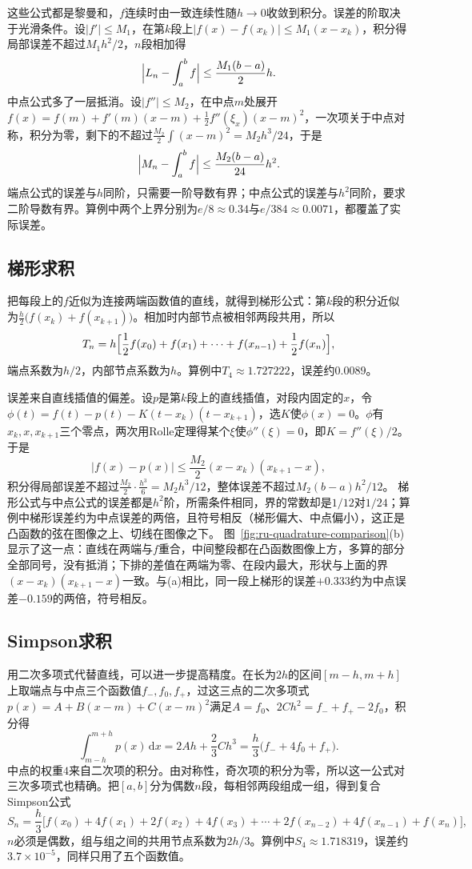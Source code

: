 这些公式都是黎曼和，$f$连续时由一致连续性随$h\to0$收敛到积分。误差的阶取决于光滑条件。设$|f'|\leq M_1$，在第$k$段上$|f(x)-f(x_k)|\leq M_1(x-x_k)$，积分得局部误差不超过$M_1h^2/2$，$n$段相加得
\[
 \Bigl|L_n-\int_a^bf\Bigr|\leq\frac{M_1(b-a)}2h.
\]
中点公式多了一层抵消。设$|f''|\leq M_2$，在中点$m$处展开$f(x)=f(m)+f'(m)(x-m)+\frac12f''(\xi_x)(x-m)^2$，一次项关于中点对称，积分为零，剩下的不超过$\frac{M_2}2\int(x-m)^2=M_2h^3/24$，于是
\[
 \Bigl|M_n-\int_a^bf\Bigr|\leq\frac{M_2(b-a)}{24}h^2.
\]
端点公式的误差与$h$同阶，只需要一阶导数有界；中点公式的误差与$h^2$同阶，要求二阶导数有界。算例中两个上界分别为$e/8\approx0.34$与$e/384\approx0.0071$，都覆盖了实际误差。

\subsection{梯形求积}
\label{sec:ru-trapezoid-rule}

把每段上的$f$近似为连接两端函数值的直线，就得到梯形公式：第$k$段的积分近似为$\frac h2\bigl(f(x_k)+f(x_{k+1})\bigr)$。相加时内部节点被相邻两段共用，所以
\[
 T_n=h\Bigl[\frac12f(x_0)+f(x_1)+\cdots+f(x_{n-1})+\frac12f(x_n)\Bigr],
\]
端点系数为$h/2$，内部节点系数为$h$。算例中$T_4\approx1.727222$，误差约$0.0089$。

误差来自直线插值的偏差。设$p$是第$k$段上的直线插值，对段内固定的$x$，令$\phi(t)=f(t)-p(t)-K(t-x_k)(t-x_{k+1})$，选$K$使$\phi(x)=0$。$\phi$有$x_k,x,x_{k+1}$三个零点，两次用Rolle定理得某个$\xi$使$\phi''(\xi)=0$，即$K=f''(\xi)/2$。于是
\[
 |f(x)-p(x)|\leq\frac{M_2}2(x-x_k)(x_{k+1}-x),
\]
积分得局部误差不超过$\frac{M_2}2\cdot\frac{h^3}6=M_2h^3/12$，整体误差不超过$M_2(b-a)h^2/12$。
梯形公式与中点公式的误差都是$h^2$阶，所需条件相同，界的常数却是$1/12$对$1/24$；算例中梯形误差约为中点误差的两倍，且符号相反（梯形偏大、中点偏小），这正是凸函数的弦在图像之上、切线在图像之下。
图~\ref{fig:ru-quadrature-comparison}(b)显示了这一点：直线在两端与$f$重合，中间整段都在凸函数图像上方，多算的部分全部同号，没有抵消；下排的差值在两端为零、在段内最大，形状与上面的界$(x-x_k)(x_{k+1}-x)$一致。与(a)相比，同一段上梯形的误差$+0.333$约为中点误差$-0.159$的两倍，符号相反。

\subsection{Simpson求积}
\label{sec:ru-simpson-rule}

用二次多项式代替直线，可以进一步提高精度。在长为$2h$的区间$[m-h,m+h]$上取端点与中点三个函数值$f_-,f_0,f_+$，过这三点的二次多项式$p(x)=A+B(x-m)+C(x-m)^2$满足$A=f_0$、$2Ch^2=f_-+f_+-2f_0$，积分得
\[
 \int_{m-h}^{m+h}p(x)\,\mathrm dx=2Ah+\frac23Ch^3=\frac h3\bigl(f_-+4f_0+f_+\bigr).
\]
中点的权重$4$来自二次项的积分。由对称性，奇次项的积分为零，所以这一公式对三次多项式也精确。把$[a,b]$分为偶数$n$段，每相邻两段组成一组，得到复合Simpson公式
\[
 S_n=\frac h3\bigl[f(x_0)+4f(x_1)+2f(x_2)+4f(x_3)+\cdots+2f(x_{n-2})+4f(x_{n-1})+f(x_n)\bigr],
\]
$n$必须是偶数，组与组之间的共用节点系数为$2h/3$。算例中$S_4\approx1.718319$，误差约$3.7\times10^{-5}$，同样只用了五个函数值。

